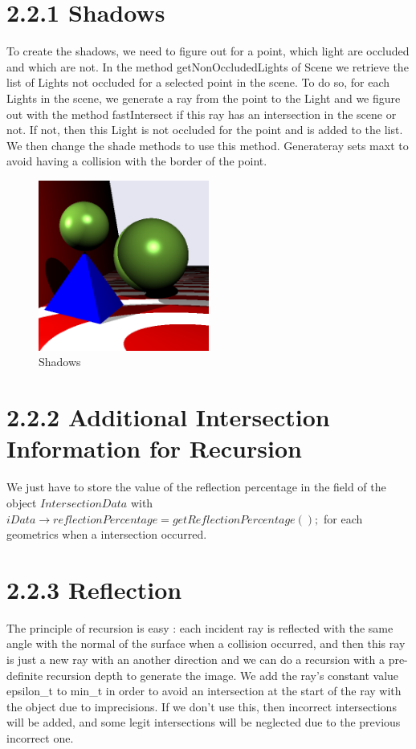 \documentclass[10pt,a4paper]{report}
\begin{document}
\section*{2.2.1   Shadows}
To create the shadows, we need to figure out for a point, which light are occluded and which are not. In the method getNonOccludedLights of Scene we retrieve the list of Lights not occluded for a selected point in the scene. To do so, for each Lights in the scene, we generate a ray from the point to the Light and we figure out with the method fastIntersect if this ray has an intersection in the scene or not. If not, then this Light is not occluded for the point and is added to the list. We then change the shade methods to use this method. Generateray sets maxt to avoid having a collision with the border of the point.
\begin{figure}[h!]
\caption{Shadows}
  \centering
    \includegraphics[width=0.5\textwidth]{02_Exc_Raytracing_Framework/2_2_1.png}
\end{figure}
\section*{2.2.2   Additional Intersection Information for Recursion}
We just have to store the value of the reflection percentage in the field of the object $IntersectionData$ with $iData\rightarrow reflectionPercentage = getReflectionPercentage();$ for each geometrics when a intersection occurred.

\section*{2.2.3   Reflection}
The principle of recursion is easy : each incident ray is reflected with the same angle with the normal of the surface when a collision occurred, and then this ray is just a new ray with an another direction and we can do a recursion with a pre-definite recursion depth to generate the image.
We add the ray's constant value epsilon\_t to min\_t in order to avoid an intersection at the start of the ray with the object due to imprecisions. If we don't use this, then incorrect intersections will be added, and some legit intersections will be neglected due to the previous incorrect one.
\end{document}
